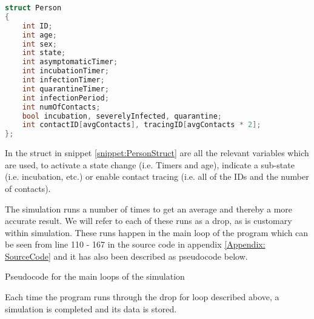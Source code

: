 \begin{lstlisting}[language=c, caption={Person Struct}, captionpos=b, label={snippet:PersonStruct}]
struct Person
{
    int ID;
    int age;
    int sex;
    int state;
    int asymptomaticTimer; 
    int incubationTimer;
    int infectionTimer;
    int quarantineTimer;
    int infectionPeriod;
    int numOfContacts;
    bool incubation, severelyInfected, quarantine;
    int contactID[avgContacts], tracingID[avgContacts * 2];
};
\end{lstlisting}

In the struct in snippet \ref{snippet:PersonStruct} are all the relevant variables which are used, to activate a state change (i.e. Timers and age), indicate a sub-state (i.e. incubation, etc.) or enable contact tracing (i.e. all of the IDs and the number of contacts).

The simulation runs a number of times to get an average and thereby a more accurate result. We will refer to each of these runs as a drop, as is customary within simulation. These runs happen in the main loop of the program which can be seen from line 110 - 167 in the source code in appendix \vref{Appendix: SourceCode} and it has also been described as pseudocode below.

\begin{algorithm}[H]
    \caption{Pseudocode for the main loops of the simulation \label{pseudo: main loop}}
\end{algorithm}
Each time the program runs through the drop for loop described above, a simulation is completed and its data is stored.


